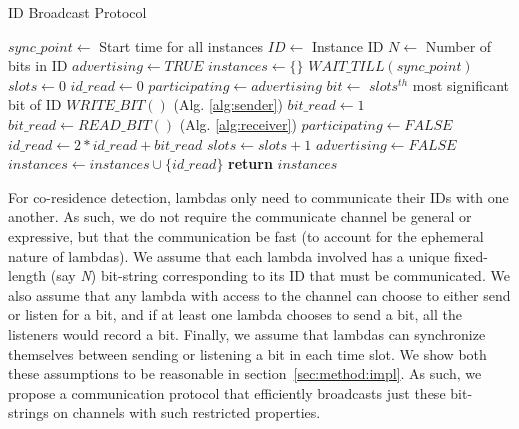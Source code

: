 \begin{algorithm}[!t]
\caption{ID Broadcast Protocol}
\label{alg:protcol}
\begin{algorithmic}[1]
\STATE $sync\_point \leftarrow$ {Start time for all instances}
\STATE $ID \leftarrow$ {Instance ID}
\STATE $N \leftarrow$ {Number of bits in ID}
\STATE $advertising \leftarrow TRUE$
\STATE $instances \leftarrow \{\} $
\STATE $WAIT\_TILL(sync\_point)$
    \STATE $slots \leftarrow 0$
    \STATE $id\_read \leftarrow 0$
    \STATE $participating \leftarrow advertising$
        \STATE $bit \leftarrow$ {$slots^{th}$ most significant bit of ID}
            \STATE $WRITE\_BIT()$               (Alg. \ref{alg:sender})
            \STATE $bit\_read \leftarrow 1$
        \ELSE
            \STATE $bit\_read \leftarrow READ\_BIT()$       (Alg. \ref{alg:receiver})
                \STATE $participating \leftarrow FALSE$
            \ENDIF
        \ENDIF
        \STATE $id\_read \leftarrow 2 * id\_read + bit\_read$
        \STATE $slots \leftarrow slots + 1$
    \ENDWHILE
        \STATE $advertising \leftarrow FALSE$
    \ENDIF
    \STATE $instances \leftarrow instances \cup \{id\_read\}$
\ENDWHILE
\STATE \textbf{return} $instances$
\end{algorithmic}
\end{algorithm}

For co-residence detection, lambdas only need to communicate their IDs with one
another. As such, we do not require the communicate channel be general or
expressive, but that the communication be fast (to account for the ephemeral
nature of lambdas). We assume that each lambda involved has a unique fixed-length (say
\emph{N}) bit-string corresponding to its ID that must be communicated.  We also
assume that any lambda with access to the channel can choose to either send or
listen for a bit, and if at least one lambda chooses to send a bit, all the
listeners would record a bit. Finally, we assume that lambdas can synchronize
themselves between sending or listening a bit in each time slot. We show both
these assumptions to be reasonable in section~\ref{sec:method:impl}. As such, we
propose a communication protocol that efficiently broadcasts just these
bit-strings on channels with such restricted properties.

